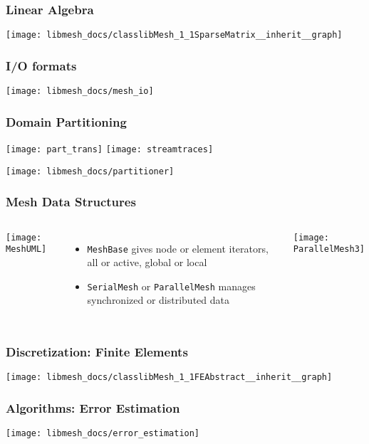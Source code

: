 \frame
{
  \frametitle{Linear Algebra}
  \begin{center}
    \texttt{[image: libmesh\_docs/classlibMesh\_1\_1SparseMatrix\_\_inherit\_\_graph]}
  \end{center}
}



\frame
{
  \frametitle{I/O formats}
  \begin{center}
    \texttt{[image: libmesh\_docs/mesh\_io]}
  \end{center}
}


\frame
{
  \frametitle{Domain Partitioning}
  \begin{center}
    \texttt{[image: part\_trans]}
    \texttt{[image: streamtraces]}
  \end{center}  

  \texttt{[image: libmesh\_docs/partitioner]}
}


\begin{frame}
\frametitle{Mesh Data Structures}
\begin{columns}
\begin{center}
\texttt{[image: MeshUML]}
\end{center}
\begin{itemize}
\item \texttt{MeshBase} gives node or element iterators, all or active, global or local
\item \texttt{SerialMesh} or \texttt{ParallelMesh} manages synchronized or distributed data
\end{itemize}

\texttt{[image: ParallelMesh3]}
\end{columns}

\end{frame}



\frame
{
  \frametitle{Discretization: Finite Elements}
  \begin{center}
    \texttt{[image: libmesh\_docs/classlibMesh\_1\_1FEAbstract\_\_inherit\_\_graph]}
  \end{center}
}      



\frame
{
  \frametitle{Algorithms: Error Estimation}
  \begin{center}
    \texttt{[image: libmesh\_docs/error\_estimation]}
  \end{center}
}





